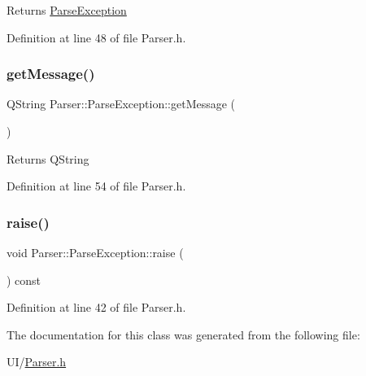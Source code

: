 \begin{DoxyReturn}{Returns}
\hyperlink{class_parser_1_1_parse_exception}{Parse\+Exception} 
\end{DoxyReturn}


Definition at line 48 of file Parser.\+h.

\mbox{\label{class_parser_1_1_parse_exception_af63b64e46a792b0692f5b5650697cf07}} 
\subsubsection{\texorpdfstring{get\+Message()}{getMessage()}}
{\footnotesize\ttfamily Q\+String Parser\+::\+Parse\+Exception\+::get\+Message (\begin{DoxyParamCaption}{ }\end{DoxyParamCaption})\hspace{0.3cm}{\ttfamily [inline]}}

\begin{DoxyReturn}{Returns}
Q\+String 
\end{DoxyReturn}


Definition at line 54 of file Parser.\+h.

\mbox{\label{class_parser_1_1_parse_exception_a0e0a14442e15e345a43f97614e6e02a5}} 
\subsubsection{\texorpdfstring{raise()}{raise()}}
{\footnotesize\ttfamily void Parser\+::\+Parse\+Exception\+::raise (\begin{DoxyParamCaption}{ }\end{DoxyParamCaption}) const\hspace{0.3cm}{\ttfamily [inline]}}



Definition at line 42 of file Parser.\+h.



The documentation for this class was generated from the following file\+:\begin{DoxyCompactItemize}
\item 
U\+I/\hyperlink{_parser_8h}{Parser.\+h}\end{DoxyCompactItemize}
